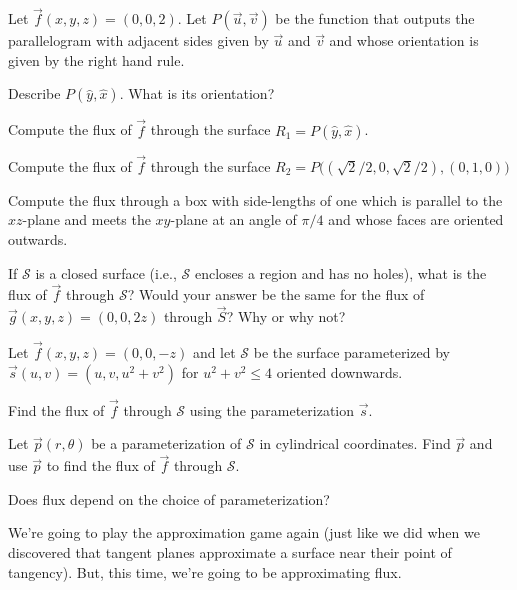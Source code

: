 \begin{question}
	Let $\vec f(x,y,z)=(0,0,2)$.  Let $P(\vec u,\vec v)$ be the function
	that outputs the parallelogram with adjacent sides given by $\vec u$ and
	$\vec v$ and whose orientation is given by the right hand rule.
	\begin{parts}
		\item Describe $P(\hat y, \hat x)$.  What is its orientation?
		\item Compute the flux of $\vec f$ through the surface $R_1= P(\hat y, \hat x)$.
		\item Compute the flux of $\vec f$ through the surface $R_2=
			P\Big( (\sqrt{2}/2,0,\sqrt{2}/2), (0,1,0) \Big)$
		\item Compute the flux through a box with side-lengths of one which
			is parallel to the $xz$-plane and meets the $xy$-plane at an
			angle of $\pi/4$ and whose faces are oriented outwards.
		\item If $\mathcal S$ is a closed surface (i.e., $\mathcal S$ encloses
			a region and has no holes), what is the flux of
			$\vec f$ through $\mathcal S$?  Would your
			answer be the same for the flux of $\vec g(x,y,z)=(0,0,2z)$
			through $\vec S$?  Why or why not?
	\end{parts}
\end{question}

\begin{question}
	Let $\vec f(x,y,z)=(0,0,-z)$ and let $\mathcal S$ be the surface
	parameterized by $\vec s(u,v) = (u,v,u^2+v^2)$ for $u^2+v^2\leq 4$ oriented
	downwards.
	\begin{parts}
		\item Find the flux of $\vec f$ through $\mathcal S$ using the parameterization $\vec s$.
		\item Let $\vec p(r,\theta)$ be a parameterization of $\mathcal S$
			in cylindrical coordinates.  Find $\vec p$ and use $\vec p$
			to find the flux of $\vec f$ through $\mathcal S$.
		\item Does flux depend on the choice of parameterization?
	\end{parts}
\end{question}

	We're going to play the approximation game again (just like
	we did when we discovered that tangent planes approximate a surface
	near their point of tangency). But, this time, we're going
	to be approximating flux.

